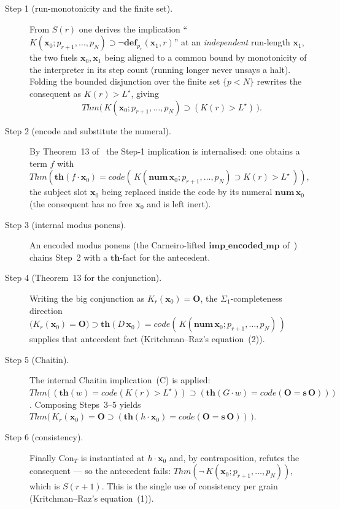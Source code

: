 \documentclass[11pt]{article}
\theoremstyle{plain}
\theoremstyle{definition}
\theoremstyle{remark}
\newcommand{\code}[1]{\mathit{code}(#1)}
\newcommand{\thmT}{\mathbf{th}}
\newcommand{\num}{\mathbf{num}}
\newcommand{\defp}{\mathbf{def}}
\newcommand{\Kc}{K}
\newcommand{\Con}{\mathrm{Con}}
\newcommand{\Thm}[1]{\mathit{Thm}(#1)}
\newcommand{\Lstar}{L^{\!\star}}
\newcommand{\imp}{\supset}
\begin{document}
\begin{description}
\item[Step 1 (run-monotonicity and the finite set).]
From $S(r)$ one derives the implication
``$\Kc(\mathbf{x}_0; p_{r+1},\dots,p_N) \imp \neg\defp_{p_r}(\mathbf{x}_1,r)$''
at an \emph{independent} run-length $\mathbf{x}_1$, the two fuels
$\mathbf{x}_0,\mathbf{x}_1$ being aligned to a common bound by
monotonicity of the interpreter in its step count (running longer never
unsays a halt). Folding the bounded disjunction over the finite set
$\{p<N\}$ rewrites the consequent as $\Kc(r) > \Lstar$, giving
\[
  \mathit{Thm}\bigl(\,\Kc(\mathbf{x}_0; p_{r+1},\dots,p_N) \imp (\Kc(r)>\Lstar)\,\bigr).
\]

\item[Step 2 (encode and substitute the numeral).]
By Theorem~13 of~\cite{arGII} the Step-1 implication is internalised: one
obtains a term $f$ with
$\Thm{\thmT(f\cdot\mathbf{x}_0)
   = \code{\,\Kc(\num\,\mathbf{x}_0; p_{r+1},\dots,p_N) \imp \Kc(r)>\Lstar\,}}$,
the subject slot $\mathbf{x}_0$ being replaced inside the code by its
numeral $\num\,\mathbf{x}_0$ (the consequent has no free $\mathbf{x}_0$
and is left inert).

\item[Step 3 (internal modus ponens).]
An encoded modus ponens (the Carneiro-lifted $\mathbf{imp\_encoded\_mp}$
of~\cite{arGII}) chains Step~2 with a $\thmT$-fact for the antecedent.

\item[Step 4 (Theorem~13 for the conjunction).]
Writing the big conjunction as $K_r(\mathbf{x}_0)=\mathbf{O}$, the
$\Sigma_1$-completeness direction
$\bigl(K_r(\mathbf{x}_0)=\mathbf{O}\bigr) \imp
  \thmT(D\,\mathbf{x}_0) = \code{\,\Kc(\num\,\mathbf{x}_0; p_{r+1},\dots,p_N)\,}$
supplies that antecedent fact (Kritchman--Raz's equation~(2)).

\item[Step 5 (Chaitin).]
The internal Chaitin implication~(C) is applied:
$\mathit{Thm}\bigl(\,(\thmT(w)=\code{\Kc(r)>\Lstar})
   \imp (\thmT(G\cdot w)=\code{\mathbf{O}=\mathbf{s}\,\mathbf{O}})\,\bigr)$.
Composing Steps~3--5 yields
$\mathit{Thm}\bigl(\,K_r(\mathbf{x}_0)=\mathbf{O}
   \imp (\thmT(h\cdot\mathbf{x}_0)=\code{\mathbf{O}=\mathbf{s}\,\mathbf{O}})\,\bigr)$.

\item[Step 6 (consistency).]
Finally $\Con_T$ is instantiated at $h\cdot\mathbf{x}_0$ and, by
contraposition, refutes the consequent --- so the antecedent fails:
$\Thm{\neg\,\Kc(\mathbf{x}_0; p_{r+1},\dots,p_N)}$, which is $S(r+1)$.
This is the single use of consistency per grain (Kritchman--Raz's
equation~(1)).
\end{description}
\end{document}

